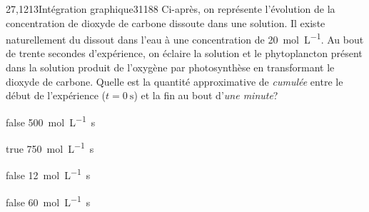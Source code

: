 \documentclass[11pt]{article}
\begin{document}
		\begin{question}{27,1213}{Intégration graphique}{3}{1188}
             Ci-après, on représente l'évolution de la concentration de dioxyde de carbone dissoute dans une solution. Il existe naturellement du  dissout dans l'eau à une concentration de \SI{20}{\mol\per\liter}. Au bout de trente secondes d'expérience, on éclaire la solution et le phytoplancton présent dans la solution produit de l'oxygène par photosynthèse en transformant le dioxyde de carbone. Quelle est la quantité approximative de  \emph{cumulée} entre le début de l'expérience ($t=\SI{0}{\second}$) et la fin au bout d'\emph{une minute}?
            \begin{figure}
             \end{figure}
        \end{question}
        \begin{reponses}
            \item[false] \SI{500}{\mol\per\liter.\second}
		    \item[true] \SI{750}{\mol\per\liter.\second}
		    \item[false] \SI{12}{\mol\per\liter.\second}
		    \item[false] \SI{60}{\mol\per\liter.\second}
		    \end{reponses}
        
\end{document}
